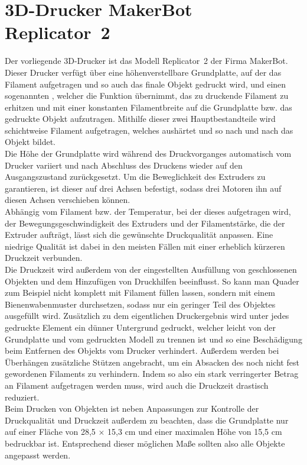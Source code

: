 \section{3D-Drucker MakerBot Replicator\texttrademark\ 2}
Der vorliegende 3D-Drucker ist das Modell Replicator\texttrademark\ 2 der Firma MakerBot.
Dieser Drucker verfügt über eine höhenverstellbare Grundplatte, auf der das Filament aufgetragen und so auch das finale Objekt gedruckt wird, und einen sogenannten , welcher die Funktion übernimmt, das zu druckende Filament zu erhitzen und mit einer konstanten Filamentbreite auf die Grundplatte bzw. das gedruckte Objekt aufzutragen. 
Mithilfe dieser zwei Hauptbestandteile wird schichtweise Filament aufgetragen, welches aushärtet und so nach und nach das Objekt bildet. \\
Die Höhe der Grundplatte wird während des Druckvorganges automatisch vom Drucker variiert und nach Abschluss des Druckens wieder auf den Ausgangszustand zurückgesetzt.
Um die Beweglichkeit des Extruders zu garantieren, ist dieser auf drei Achsen befestigt, sodass drei Motoren ihn auf diesen Achsen verschieben können. \\
Abhängig vom Filament bzw. der Temperatur, bei der dieses aufgetragen wird, der Bewegungsgeschwindigkeit des Extruders und der Filamentstärke, die der Extruder aufträgt, lässt sich die gewünschte Druckqualität anpassen.
Eine niedrige Qualität ist dabei in den meisten Fällen mit einer erheblich kürzeren Druckzeit verbunden. \\
Die Druckzeit wird außerdem von der eingestellten Ausfüllung von geschlossenen Objekten und dem Hinzufügen von Druckhilfen beeinflusst.
So kann man Quader zum Beispiel nicht komplett mit Filament füllen lassen, sondern mit einem Bienenwabenmuster durchsetzen, sodass nur ein geringer Teil des Objektes ausgefüllt wird.
Zusätzlich zu dem eigentlichen Druckergebnis wird unter jedes gedruckte Element ein dünner Untergrund gedruckt, welcher leicht von der Grundplatte und vom gedruckten Modell zu trennen ist und so eine Beschädigung beim Entfernen des Objekts vom Drucker verhindert.
Außerdem werden bei Überhängen zusätzliche Stützen angebracht, um ein Absacken des noch nicht fest gewordenen Filaments zu verhindern. 
Indem so also ein stark verringerter Betrag an Filament aufgetragen werden muss, wird auch die Druckzeit drastisch reduziert. \\
Beim Drucken von Objekten ist neben Anpassungen zur Kontrolle der Druckqualität und Druckzeit außerdem zu beachten, dass die Grundplatte nur auf einer Fläche von 28,5 $\times$ 15,3 cm und einer maximalen Höhe von 15,5 cm bedruckbar ist.
Entsprechend dieser möglichen Maße sollten also alle Objekte angepasst werden.
